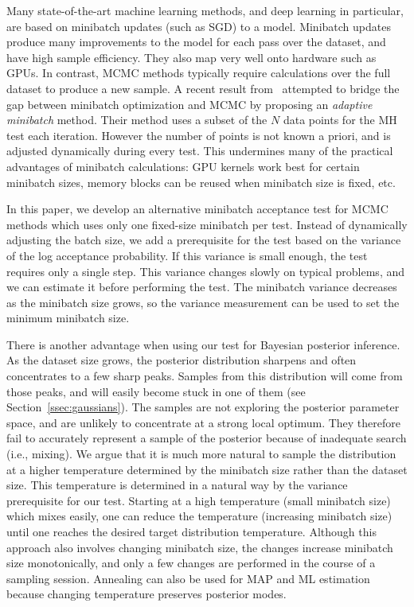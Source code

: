 \documentclass{article}
\begin{document}
Many state-of-the-art machine learning methods, and deep learning in
particular, are based on minibatch updates (such as SGD) to a model.
Minibatch updates produce many improvements to the model for each pass
over the dataset, and have high sample efficiency. They also map very
well onto hardware such as GPUs. In contrast, MCMC methods typically
require calculations over the full dataset to produce a new sample. A
recent result from~\cite{cutting_mh_2014} attempted to bridge the gap
between minibatch optimization and MCMC by proposing an \emph{adaptive
  minibatch} method. Their method uses a subset of the $N$ data points
for the MH test each iteration. However the number of points is not
known a priori, and is adjusted dynamically during every test. This
undermines many of the practical advantages of minibatch calculations: 
GPU kernels work best for certain minibatch sizes, memory blocks
can be reused when minibatch size is fixed, etc. 

In this paper, we develop an alternative minibatch acceptance test for MCMC
methods which uses only one fixed-size minibatch per test. Instead of
dynamically adjusting the batch size, we add a prerequisite for the test
based on the variance of the log acceptance probability. If this
variance is small enough, the test requires only a single step. This
variance changes slowly on typical problems, and we can estimate it
before performing the test. The minibatch variance
decreases as the minibatch size grows, so the variance measurement can be
used to set the minimum minibatch size.

There is another advantage when using our test for Bayesian
posterior inference. As the dataset size grows, the posterior distribution
sharpens and often concentrates to a few sharp peaks. Samples from
this distribution will come from those peaks, and will easily become
stuck in one of them (see Section~\ref{ssec:gaussians}).  The samples are not exploring
the posterior parameter space, and are unlikely to concentrate at a
strong local optimum. They therefore fail to accurately represent a
sample of the posterior because of inadequate search (i.e.,
mixing). We argue that it is much more natural to sample the
distribution at a higher temperature determined by the
minibatch size rather than the dataset size. This temperature is
determined in a natural way by the variance prerequisite for our
test. Starting at a high temperature (small minibatch size) which
mixes easily, one can reduce the temperature (increasing minibatch
size) until one reaches the desired target distribution temperature.
Although this approach also involves changing minibatch size, the
changes increase minibatch size monotonically, and only a few changes
are performed in the course of a sampling session.
Annealing can also be used for MAP and ML estimation because changing temperature preserves
posterior modes. 
\end{document}
